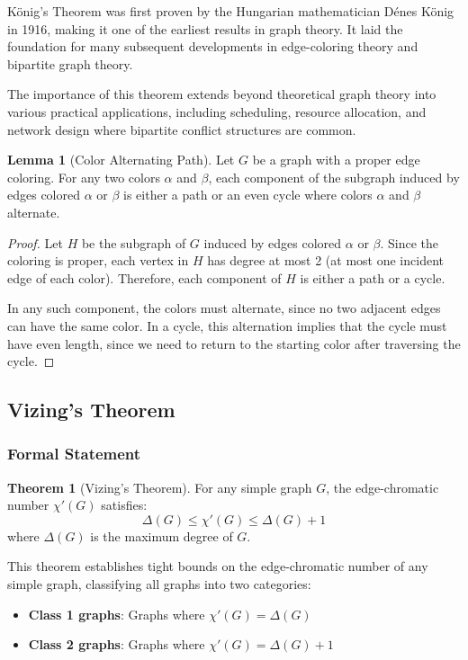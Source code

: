 \documentclass{article}
\theoremstyle{definition}
\newtheorem{theorem}{Theorem}
\newtheorem{lemma}{Lemma}
\begin{document}
König's Theorem was first proven by the Hungarian mathematician Dénes König in 1916, making it one of the earliest results in graph theory. It laid the foundation for many subsequent developments in edge-coloring theory and bipartite graph theory.

The importance of this theorem extends beyond theoretical graph theory into various practical applications, including scheduling, resource allocation, and network design where bipartite conflict structures are common.

\begin{lemma}[Color Alternating Path]
Let $G$ be a graph with a proper edge coloring. For any two colors $\alpha$ and $\beta$, each component of the subgraph induced by edges colored $\alpha$ or $\beta$ is either a path or an even cycle where colors $\alpha$ and $\beta$ alternate.
\end{lemma}

\begin{proof}
Let $H$ be the subgraph of $G$ induced by edges colored $\alpha$ or $\beta$. Since the coloring is proper, each vertex in $H$ has degree at most 2 (at most one incident edge of each color). Therefore, each component of $H$ is either a path or a cycle. 

In any such component, the colors must alternate, since no two adjacent edges can have the same color. In a cycle, this alternation implies that the cycle must have even length, since we need to return to the starting color after traversing the cycle.
\end{proof}

\subsection{Vizing's Theorem}

\subsubsection{Formal Statement}

\begin{theorem}[Vizing's Theorem]
For any simple graph $G$, the edge-chromatic number $\chi'(G)$ satisfies:
\begin{equation}
\Delta(G) \leq \chi'(G) \leq \Delta(G) + 1
\end{equation}
where $\Delta(G)$ is the maximum degree of $G$.
\end{theorem}

This theorem establishes tight bounds on the edge-chromatic number of any simple graph, classifying all graphs into two categories:
\begin{itemize}
\item \textbf{Class 1 graphs}: Graphs where $\chi'(G) = \Delta(G)$
\item \textbf{Class 2 graphs}: Graphs where $\chi'(G) = \Delta(G) + 1$
\end{itemize}
\end{document}
